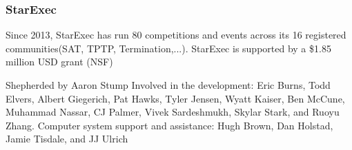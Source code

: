 \documentclass[table]{beamer}
\begin{document}

\begin{frame}
    \frametitle{StarExec}
    Since 2013, StarExec has run 80 competitions and events across its 16 registered communities(SAT, TPTP, Termination,...).  
    StarExec is supported by a \$1.85 million USD grant (NSF)

\vfill
Shepherded by Aaron Stump
\vfill
Involved in the development: {\small Eric Burns, Todd Elvers,
Albert Giegerich, Pat Hawks, Tyler Jensen, Wyatt Kaiser, Ben McCune, Muhammad
Nassar, CJ Palmer, Vivek Sardeshmukh, Skylar Stark, and Ruoyu Zhang.}
\vfill
Computer system support and assistance: {\small Hugh Brown, Dan Holstad, Jamie
Tisdale, and JJ Ulrich}

\end{frame}
\end{document}
